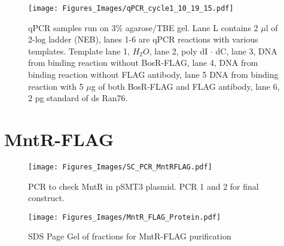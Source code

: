 \documentclass[12pt,twoside]{reedthesis}
\begin{document}
 
      		 \begin{figure}[h!tbp]
      		\centering
      		\texttt{[image: Figures\_Images/qPCR\_cycle1\_10\_19\_15.pdf]}
      		\caption[qPCR of 1st Cycle of CASTing Gel Analysis]{qPCR samples run on 3\% agarose/TBE gel. Lane L contains 2 $\mu$l of 2-log ladder (NEB), lanes 1-6 are qPCR reactions with various templates. Template lane 1, $H_{2}O$, lane 2, poly dI $\cdot$ dC, lane 3, DNA from binding reaction without BosR-FLAG, lane 4, DNA from binding reaction without FLAG antibody, lane 5 DNA from binding reaction with 5 $\mu$g of both BosR-FLAG and FLAG antibody, lane 6, 2 pg standard of ds Ran76.}
      		\label{qPCRcycle1}
      	\end{figure}
 
 \clearpage
      	
      	
      	
  
  \section*{MntR-FLAG}
        	\begin{figure}[h!tbp]
        		\centering
        		\texttt{[image: Figures\_Images/SC\_PCR\_MntRFLAG.pdf]}
        		\caption[PCR to Create MntR-FLAG]{PCR to check MntR in pSMT3 plasmid. PCR 1 and 2 for final construct.}
        		\label{PCRMntRFLAG}
        	\end{figure}
     
        	\begin{figure}[h!tbp]
        		\centering
        		\texttt{[image: Figures\_Images/MntR\_FLAG\_Protein.pdf]}
        		\caption[MntR-FLAG Purification]{SDS Page Gel of fractions for MntR-FLAG purification}
        		\label{PurificationMntRFLAG}
        	\end{figure}
     
\end{document}
